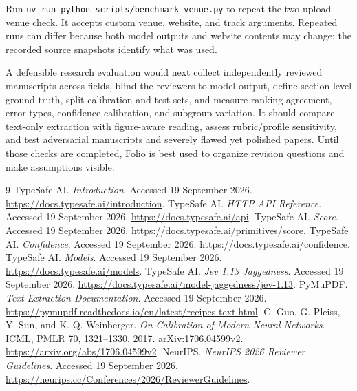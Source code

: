\documentclass[11pt]{article}
\newcommand{\code}[1]{\texttt{#1}}
\begin{document}
Run \code{uv run python scripts/benchmark\_venue.py} to repeat the two-upload venue check. It accepts custom venue, website, and track arguments. Repeated runs can differ because both model outputs and website contents may change; the recorded source snapshots identify what was used.

A defensible research evaluation would next collect independently reviewed manuscripts across fields, blind the reviewers to model output, define section-level ground truth, split calibration and test sets, and measure ranking agreement, error types, confidence calibration, and subgroup variation. It should compare text-only extraction with figure-aware reading, assess rubric/profile sensitivity, and test adversarial manuscripts and severely flawed yet polished papers. Until those checks are completed, Folio is best used to organize revision questions and make assumptions visible.

\begin{thebibliography}{9}
 TypeSafe AI. \emph{Introduction}. Accessed 19 September 2026. \url{https://docs.typesafe.ai/introduction}.
 TypeSafe AI. \emph{HTTP API Reference}. Accessed 19 September 2026. \url{https://docs.typesafe.ai/api}.
 TypeSafe AI. \emph{Score}. Accessed 19 September 2026. \url{https://docs.typesafe.ai/primitives/score}.
 TypeSafe AI. \emph{Confidence}. Accessed 19 September 2026. \url{https://docs.typesafe.ai/confidence}.
 TypeSafe AI. \emph{Models}. Accessed 19 September 2026. \url{https://docs.typesafe.ai/models}.
 TypeSafe AI. \emph{Jev 1.13 Jaggedness}. Accessed 19 September 2026. \url{https://docs.typesafe.ai/model-jaggedness/jev-1.13}.
 PyMuPDF. \emph{Text Extraction Documentation}. Accessed 19 September 2026. \url{https://pymupdf.readthedocs.io/en/latest/recipes-text.html}.
 C. Guo, G. Pleiss, Y. Sun, and K. Q. Weinberger. \emph{On Calibration of Modern Neural Networks}. ICML, PMLR 70, 1321--1330, 2017. arXiv:1706.04599v2. \url{https://arxiv.org/abs/1706.04599v2}.
 NeurIPS. \emph{NeurIPS 2026 Reviewer Guidelines}. Accessed 19 September 2026. \url{https://neurips.cc/Conferences/2026/ReviewerGuidelines}.
\end{thebibliography}
\end{document}
